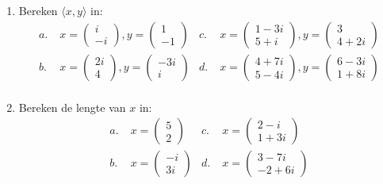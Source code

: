 \documentclass[../main.tex]{subfiles}
\begin{document}
\begin{opdrachtlang}
\begin{enumerate}
    \item Bereken $\langle x,y\rangle$ in:
     \begin{align*}
        a.\;& x=\begin{pmatrix}i\\-i\end{pmatrix}, y=\begin{pmatrix}1\\-1\end{pmatrix}
        & c.\;& x=\begin{pmatrix}1-3i\\5+i\end{pmatrix}, y=\begin{pmatrix}3\\4+2i\end{pmatrix}\\
        b.\;& x=\begin{pmatrix}2i\\4\end{pmatrix}, y=\begin{pmatrix}-3i\\i\end{pmatrix}
        & d.\;& x=\begin{pmatrix}4+7i\\5-4i\end{pmatrix}, y=\begin{pmatrix}6-3i\\1+8i\end{pmatrix}\\
    \end{align*}
    \item Bereken de lengte van $x$ in:
     \begin{align*}
        a.\;& x=\begin{pmatrix}5\\2\end{pmatrix}
        & c.\;& x=\begin{pmatrix}2-i\\1+3i\end{pmatrix}\\
        b.\;& x=\begin{pmatrix}-i\\3i\end{pmatrix}
        & d.\;& x=\begin{pmatrix}3-7i\\-2+6i\end{pmatrix}\\

\end{align*}
\end{enumerate}
\end{opdrachtlang}
\end{document}
